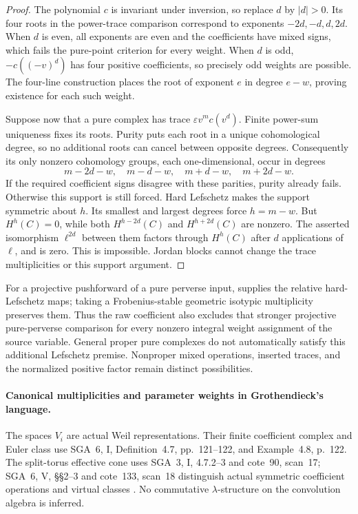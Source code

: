 \begin{proof}
The polynomial \(c\) is invariant under inversion,
so replace \(d\) by \(|d|>0\). Its four roots in
the power-trace comparison correspond to exponents
\(-2d,-d,d,2d\). When \(d\) is even, all exponents
are even and the coefficients have mixed signs, which
fails the pure-point criterion for every weight.
When \(d\) is odd, \(-c((-v)^d)\) has four positive
coefficients, so precisely odd weights are possible.
The four-line construction places the root of exponent
\(e\) in degree \(e-w\), proving existence for each
such weight.

Suppose now that a pure complex has trace
\(\varepsilon v^m c(v^d)\). Finite power-sum uniqueness
fixes its roots. Purity puts each root in a unique
cohomological degree, so no additional roots can cancel
between opposite degrees. Consequently its only
nonzero cohomology groups, each one-dimensional, occur
in degrees
\[
 m-2d-w,\quad m-d-w,\quad m+d-w,\quad m+2d-w.
\]
If the required coefficient signs disagree with these
parities, purity already fails. Otherwise this support
is still forced. Hard Lefschetz makes the support
symmetric about \(h\). Its smallest and largest degrees
force \(h=m-w\). But \(H^h(C)=0\), while both
\(H^{h-2d}(C)\) and \(H^{h+2d}(C)\) are nonzero.
The asserted isomorphism \(\ell^{2d}\) between them
factors through \(H^h(C)\) after \(d\) applications
of \(\ell\), and is zero. This is impossible.
Jordan blocks cannot change the trace multiplicities
or this support argument.
\end{proof}

For a projective pushforward of a pure perverse input,
\cite[5.4.10, p.~144]{BBD} supplies the relative
hard-Lefschetz maps; taking a Frobenius-stable geometric
isotypic multiplicity preserves them. Thus the raw
coefficient also excludes that stronger projective
pure-perverse comparison for every nonzero integral
weight assignment of the source variable. General
proper pure complexes do not automatically satisfy
this additional Lefschetz premise. Nonproper mixed
operations, inserted traces, and the normalized
positive factor remain distinct possibilities.

\paragraph{Canonical multiplicities and parameter weights in Grothendieck's language.}
The spaces \(V_i\) are actual Weil representations.
Their finite coefficient complex and Euler class use
SGA~6, I, Definition~4.7, pp.~121--122, and
Example~4.8, p.~122. The split-torus effective cone
uses SGA~3, I, 4.7.2--3 and cote~90, scan~17;
SGA~6, V, \S\S2--3 and cote~133, scan~18 distinguish
actual symmetric coefficient operations and virtual
classes \cite{SGA3,SGA6,Archive}.
No commutative \(\lambda\)-structure on the convolution
algebra is inferred.

